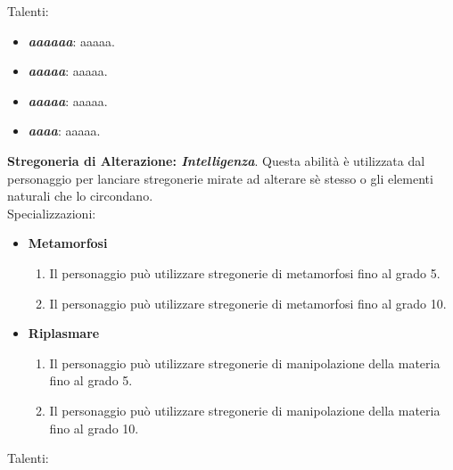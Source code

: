 \documentclass[../manuale_main.tex]{subfiles}
\begin{document}
Talenti:
\begin{itemize}
\item \textbf{\textit{aaaaaa}}: aaaaa.
\item \textbf{\textit{aaaaa}}: aaaaa.
\item \textbf{\textit{aaaaa}}: aaaaa.
\item \textbf{\textit{aaaa}}: aaaaa.
\end{itemize}

\textbf{Stregoneria di Alterazione: \textit{Intelligenza}}. Questa abilità è utilizzata dal personaggio per lanciare stregonerie mirate ad alterare sè stesso o gli elementi naturali che lo circondano.
\\Specializzazioni:

\begin{itemize} 
\item\textbf{Metamorfosi}
\begin{enumerate}
\item Il personaggio può utilizzare stregonerie di metamorfosi fino al grado 5.
\item Il personaggio può utilizzare stregonerie di metamorfosi fino al grado 10. 

\end{enumerate}

\item\textbf{Riplasmare}
\begin{enumerate}
\item Il personaggio può utilizzare stregonerie di manipolazione della materia fino al grado 5.
\item Il personaggio può utilizzare stregonerie di manipolazione della materia fino al grado 10.

\end{enumerate}
\end{itemize}

Talenti:
\end{document}
